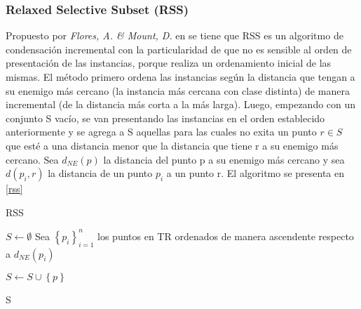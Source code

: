 \subsubsection{Relaxed Selective Subset (RSS)}

 Propuesto por \emph{Flores, A. \& Mount, D.} en \cite{floresnearest} se tiene que RSS es un algoritmo de condensación incremental con la particularidad de que no es sensible al orden de presentación de las instancias, porque realiza un ordenamiento inicial de las mismas. El método primero ordena las instancias según la distancia que tengan a su enemigo más cercano (la instancia más cercana con clase distinta) de manera incremental (de la distancia más corta a la más larga). Luego, empezando con un conjunto S vacío, se van presentando las instancias en el orden establecido anteriormente y se agrega a S aquellas para las cuales no exita un punto $r \in S$ que esté a una distancia menor que la distancia que tiene r a su enemigo más cercano. Sea $d_{NE}(p)$ la distancia del punto p a su enemigo más cercano y sea $d(p_i,r)$ la distancia de un punto $p_i$ a un punto r. El algoritmo se presenta en \ref{rss}

\begin{algorithm}
\caption{RSS}
\label{rss}
\begin{algorithmic}[1]


\State $S \gets \emptyset$
\State Sea $\left\{p_i\right\}_{i=1}^n$ los puntos en TR ordenados de manera ascendente respecto a $d_{NE}(p_i)$

		\State $S \gets S \cup \left\{p\right\}$
	\EndIf
\EndFor

\Return S

\end{algorithmic}
\end{algorithm}

